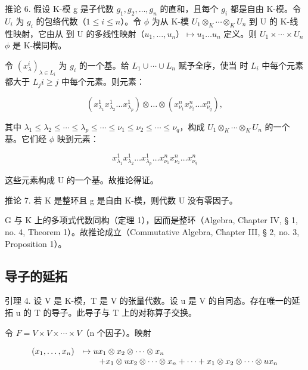 推论 6. 假设 K-模 g 是子代数 \(g_{1}, g_{2}, \ldots, g_{n}\) 的直和，且每个 \(g_{i}\) 都是自由 K-模。令 \(U_{i}\) 为 \(g_{i}\) 的包络代数（\(1 \leqslant i \leqslant n\)）。令 \(\phi\) 为从 K-模 \(U_{1} \otimes_{K} \cdots \otimes_{K} U_{n}\) 到 U 的 K-线性映射，它由从  到 U 的多线性映射（\(u_{1}, \ldots, u_{n}\)）\(\mapsto u_{1} \ldots u_{n}\) 定义。则 \(U_{1} \times \cdots \times U_{n}\)\(\phi\) 是 K-模同构。

令 \((x_{\lambda}^{i})_{\lambda \in L_{i}}\) 为 \(g_{i}\) 的一个基。给 \(L_{1} \cup \cdots \cup L_{n}\) 赋予全序，使当  时 \(L_{i}\) 中每个元素都大于 \(L_{j}\)\(i \geqslant j\) 中每个元素。则元素：

\[
\left(x _ {\lambda_ {1}} ^ {1} x _ {\lambda_ {2}} ^ {1} \dots x _ {\lambda_ {p}} ^ {1}\right) \otimes \dots \otimes \left(x _ {\nu _ {1}} ^ {n} x _ {\nu _ {2}} ^ {n} \dots x _ {\nu _ {q}} ^ {n}\right),
\]

其中 \(\lambda_{1}\leqslant\lambda_{2}\leqslant\cdots\leqslant\lambda_{p}\leqslant\cdots\leqslant\nu_{1}\leqslant\nu_{2}\leqslant\cdots\leqslant\nu_{q}\)，构成 \(U_{1}\otimes_{K}\cdots\otimes_{K}U_{n}\) 的一个基。它们经 \(\phi\) 映到元素：

\[
x _ {\lambda_ {1}} ^ {1} x _ {\lambda_ {2}} ^ {1} \dots x _ {\lambda_ {p}} ^ {1} \dots x _ {\nu_ {1}} ^ {n} x _ {\nu_ {2}} ^ {n} \dots x _ {\nu_ {q}} ^ {n}
\]

这些元素构成 U 的一个基。故推论得证。

推论 7. 若 K 是整环且 g 是自由 K-模，则代数 U 没有零因子。

G 与 K 上的多项式代数同构（定理 1），因而是整环（Algebra, Chapter IV, § 1, no. 4, Theorem 1）。故推论成立（Commutative Algebra, Chapter III, § 2, no. 3, Proposition 1）。

\subsection{导子的延拓}

引理 4. 设 V 是 K-模，T 是 V 的张量代数。设 u 是 V 的自同态。存在唯一的延拓 u 的 T 的导子。此导子与 T 上的对称算子交换。

令 \(F = V \times V \times \cdots \times V\)（n 个因子）。映射

\[
\begin{array}{r l} (x _ {1}, \ldots , x _ {n}) & \mapsto u x _ {1} \otimes x _ {2} \otimes \dots \otimes x _ {n} \\ & \qquad + x _ {1} \otimes u x _ {2} \otimes \dots \otimes x _ {n} + \dots + x _ {1} \otimes x _ {2} \otimes \dots \otimes u x _ {n} \end{array}
\]

